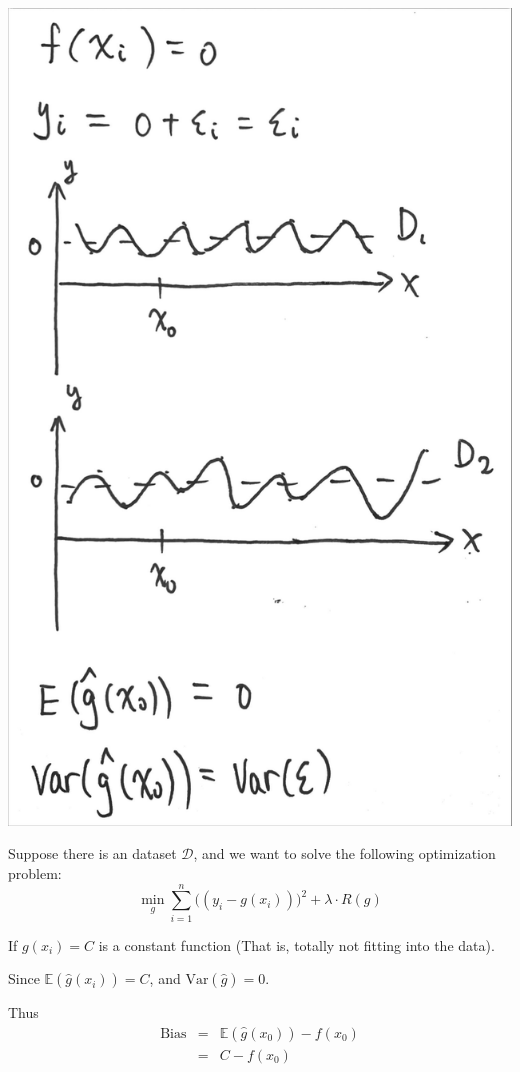 \documentclass{article}
\theoremstyle{MyNonumberplain}
\theoremstyle{break}
\newcommand{\ev}{\mathbb{E}}
\newcommand{\var}{\text{Var}}
\newcommand{\bias}{\text{Bias}}
\theoremstyle{break}
\theoremstyle{break}
\theoremstyle{break}
\begin{document}
\begin{center}
    \includegraphics*[scale=0.1]{img5.jpg}
\end{center}

Suppose there is an dataset $\mathcal{D}$, and we want to solve the following optimization problem: $$\min_g\sum_{i=1}^{n}\bigl((y_i-g(x_i))\bigr)^2+\lambda\cdot R(g)$$

If $g(x_i)=C$ is a constant function (That is, totally not fitting into the data).

Since $\ev(\hat{g}(x_i))=C$, and $\var(\hat{g})=0$.

Thus 
\begin{eqnarray*}
    \bias &=&\ev(\hat{g}(x_0))-f(x_0)\\
          &=& C-f(x_0)
\end{eqnarray*}
\end{document}
